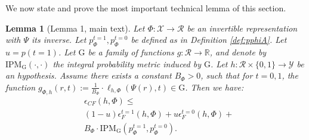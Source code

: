 \documentclass{article}
\newtheorem{thmapplem}{Lemma}
\def\cX{\mathcal X}
\def\cY{\mathcal Y}
\def\cF{\mathrm{G}}
\def\cR{\mathcal{R}}
\def \R{\mathbb{R}}
\newcommand{\pc}{p^{t=0}}
\newcommand{\pt}{p^{t=1}}
\newcommand{\lythr}{\ell_{h,\Phi}(\Psi(r),t)}
\begin{document}
We now state and prove the most important technical lemma of this section.
\begin{thmapplem}[Lemma 1, main text]\label{lem:genA}
Let $\Phi: \cX \rightarrow \cR$ be an invertible representation with $\Psi$ its inverse. Let $\pt_\Phi, \pc_\Phi$ be defined as in Definition \ref{def:pphiA}. Let $u = p(t=1)$. Let $\cF$ be a family of functions $g:\cR \rightarrow \R$, and denote by $\text{IPM}_\cF(\cdot, \cdot)$ the integral probability metric induced by $\cF$.  Let $h : \cR \times \{0,1\} \rightarrow \cY$ be an hypothesis. Assume there exists a constant $B_\Phi>0$, such that for $t=0,1$, the function $g_{\Phi,h}(r,t) := \frac{1}{B_\Phi} \cdot  \lythr \in \cF$. Then we have:
\begin{align}
&\epsilon_{CF}(h,\Phi) \leq \nonumber \\
&(1-u)  \epsilon^{t=1}_F(h,\Phi) + u  \epsilon^{t=0}_F(h,\Phi) + \nonumber \\ 
&  B_\Phi \cdot \text{IPM}_\cF\left( \pt_\Phi, \pc_\Phi \right).
\end{align}
\end{thmapplem}
\end{document}

